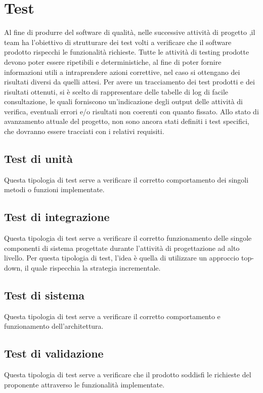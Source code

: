 \newpage
\section{Test}
Al fine di produrre del software di qualità, nelle successive attività di progetto ,il team ha l'obiettivo di strutturare dei test volti a verificare che il software prodotto rispecchi le funzionalità richieste.
Tutte le attività di testing prodotte devono poter essere ripetibili e deterministiche, al fine di poter fornire informazioni utili a intraprendere azioni correttive, nel caso si ottengano dei risultati diversi da quelli attesi.
Per avere un tracciamento dei test prodotti e dei risultati ottenuti, si è scelto di rappresentare delle tabelle di log di facile consultazione, le quali forniscono un'indicazione degli output delle attività di verifica, eventuali errori e/o risultati non coerenti con quanto fissato.
Allo stato di avanzamento attuale del progetto, non sono ancora stati definiti i test specifici, che dovranno essere tracciati con i relativi requisiti. 

	\subsection{Test di unità}
	Questa tipologia di test serve a verificare il corretto comportamento dei singoli metodi o funzioni implementate.
	
	\subsection{Test di integrazione}
	Questa tipologia di test serve a verificare il corretto funzionamento delle singole componenti di sistema progettate durante l'attività di progettazione ad alto livello.
	Per questa tipologia di test, l'idea è quella di utilizzare un approccio top-down, il quale rispecchia la strategia incrementale.
	
	\subsection{Test di sistema}
	Questa tipologia di test serve a verificare il corretto comportamento e funzionamento dell’architettura.
	
	\subsection{Test di validazione}
	Questa tipologia di test serve a verificare che il prodotto soddisfi le richieste del proponente attraverso le funzionalità implementate.